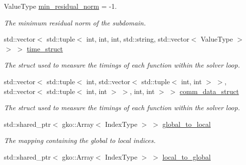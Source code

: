 \begin{DoxyCompactItemize}
Value\+Type \hyperlink{structSchwarzWrappers_1_1Metadata_a536b647d0c8ec4328e46583a53fa19b3}{min\+\_\+residual\+\_\+norm} = -\/1.
\begin{DoxyCompactList}\small\item\em The minimum residual norm of the subdomain. \end{DoxyCompactList}\item 
\mbox{\label{structSchwarzWrappers_1_1Metadata_ab7ada6e651162c2f2399bf35f7a13098}} 
std\+::vector$<$ std\+::tuple$<$ int, int, int, std\+::string, std\+::vector$<$ Value\+Type $>$ $>$ $>$ \hyperlink{structSchwarzWrappers_1_1Metadata_ab7ada6e651162c2f2399bf35f7a13098}{time\+\_\+struct}
\begin{DoxyCompactList}\small\item\em The struct used to measure the timings of each function within the solver loop. \end{DoxyCompactList}\item 
\mbox{\label{structSchwarzWrappers_1_1Metadata_a342382f3b90540675d7dfb311b0f4168}} 
std\+::vector$<$ std\+::tuple$<$ int, std\+::vector$<$ std\+::tuple$<$ int, int $>$ $>$, std\+::vector$<$ std\+::tuple$<$ int, int $>$ $>$, int, int $>$ $>$ \hyperlink{structSchwarzWrappers_1_1Metadata_a342382f3b90540675d7dfb311b0f4168}{comm\+\_\+data\+\_\+struct}
\begin{DoxyCompactList}\small\item\em The struct used to measure the timings of each function within the solver loop. \end{DoxyCompactList}\item 
\mbox{\label{structSchwarzWrappers_1_1Metadata_aa12f9a6e8e1fefb40887078d7a857d97}} 
std\+::shared\+\_\+ptr$<$ gko\+::\+Array$<$ Index\+Type $>$ $>$ \hyperlink{structSchwarzWrappers_1_1Metadata_aa12f9a6e8e1fefb40887078d7a857d97}{global\+\_\+to\+\_\+local}
\begin{DoxyCompactList}\small\item\em The mapping containing the global to local indices. \end{DoxyCompactList}\item 
\mbox{\label{structSchwarzWrappers_1_1Metadata_ac14f658766f8e345636bc6f37379b202}} 
std\+::shared\+\_\+ptr$<$ gko\+::\+Array$<$ Index\+Type $>$ $>$ \hyperlink{structSchwarzWrappers_1_1Metadata_ac14f658766f8e345636bc6f37379b202}{local\+\_\+to\+\_\+global}

\end{DoxyCompactItemize}
